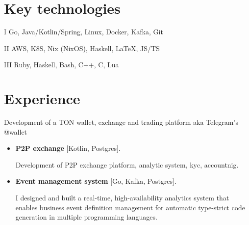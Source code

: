 \documentclass{cv}
\begin{document}


\begin{center}






\end{center}


\section{Key technologies}

\begin{cvblock}{I}
	Go, Java/Kotlin/Spring, Linux, Docker, Kafka, Git
\end{cvblock}

\begin{cvblock}{II}
	AWS, K8S, Nix (NixOS), Haskell, \LaTeX, JS/TS
\end{cvblock}

\begin{cvblock}{III}
	Ruby, Haskell, Bash, C++, C, Lua
\end{cvblock}


\section{Experience}

\begin{cvblock}{
		}

	Development of a TON wallet, exchange and trading platform aka Telegram's @wallet

	\begin{itemize}
		\item \textbf{P2P exchange} [Kotlin, Postgres].

		      Development of P2P exchange platform, analytic system, kyc, accountnig.

		\item \textbf{Event management system} [Go, Kafka, Postgres].

		      I designed and built a real-time, high-availability analytics system that enables
		      business event definition management for automatic type-strict code generation
		      in multiple programming languages.

	\end{itemize}
\end{cvblock}
\end{document}
